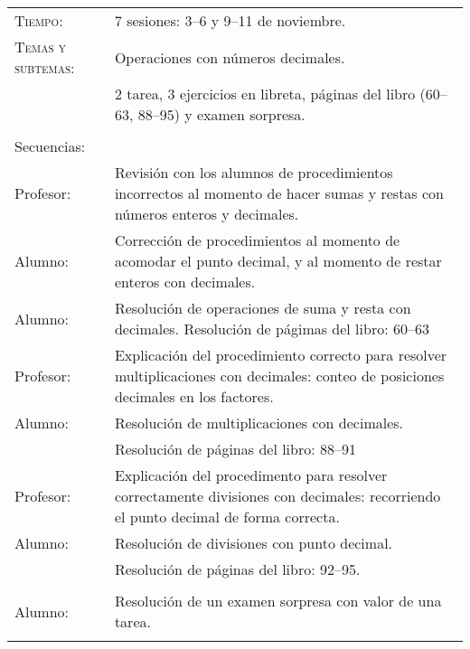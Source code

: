 \documentclass[letterpaper,10pt]{article}
\begin{document}
\begin{tabular}[t]{R{0.25\textwidth}p{0.71\textwidth}}

\hline

    \textsc{Tiempo:}                    & 7 sesiones: 3--6 y 9--11  de noviembre. \\
    \textsc{Temas y subtemas:}          & Operaciones con n\'umeros decimales.\\
              & 2 tarea, 3 ejercicios en libreta, p\'aginas del libro (60--63, 88--95) y examen sorpresa. \\ \\
    \large{\sc Secuencias:} \\
    Profesor:    & Revisi\'on con los alumnos de procedimientos incorrectos al momento de hacer sumas y restas con n\'umeros enteros y decimales. \\
    Alumno:     & Correcci\'on de procedimientos al momento de acomodar el punto decimal, y al momento de restar enteros con decimales.\\
    Alumno:     & Resoluci\'on de operaciones de suma y resta con decimales. Resolución de p\'agimas del libro: 60--63 \\
    Profesor:   & Explicaci\'on del procedimiento correcto para resolver multiplicaciones con decimales: conteo de posiciones decimales en los factores. \\

    Alumno:     & Resoluci\'on de multiplicaciones con decimales. \\
                & Resoluci\'on de p\'aginas del libro: 88--91 \\
    Profesor:   & Explicaci\'on del procedimento para resolver correctamente divisiones con decimales: recorriendo el punto decimal de forma correcta. \\
    Alumno:     & Resoluci\'on de divisiones con punto decimal. \\ 
                & Resoluci\'on de p\'aginas del libro: 92--95. \\ \\
    Alumno:     & Resoluci\'on de un examen sorpresa con valor de una tarea.
\\ \hline \\
\end{tabular}
\end{document}
